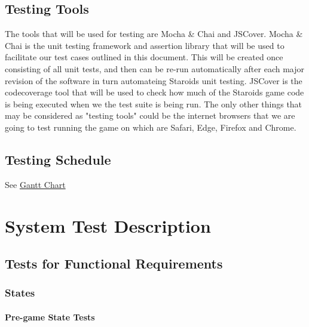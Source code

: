 \documentclass[12pt, titlepage]{article}
\begin{document}
\subsection{Testing Tools}
The tools that will be used for testing are Mocha \& Chai and JSCover. Mocha \& Chai is the unit testing framework and assertion library that will be used to facilitate our test cases outlined in this document. This will be created once consisting of all unit tests, and then can be re-run automatically after each major revision of the software in turn automateing Staroids unit testing. JSCover is the codecoverage tool that will be used to check how much of the Staroids game code is being executed when we the test suite is being run. The only other things that may be considered as "testing tools" could be the internet browsers that we are going to test running the game on which are Safari, Edge, Firefox and Chrome.

\subsection{Testing Schedule}

See \href{https://gitlab.cas.mcmaster.ca/nagyj2/Staroids/tree/master/ProjectSchedule/StaroidsGantt.pdf}{Gantt Chart}

\section{System Test Description}

\subsection{Tests for Functional Requirements}

\subsubsection{States}

\paragraph{Pre-game State Tests}
\end{document}
